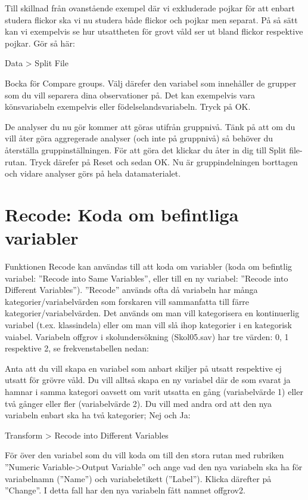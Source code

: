 \documentclass[
]{book}
\begin{document}
Till skillnad från ovanstående exempel där vi exkluderade pojkar för att enbart studera flickor ska vi nu studera både flickor och pojkar men separat. På så sätt kan vi exempelvis se hur utsattheten för grovt våld ser ut bland flickor respektive pojkar. Gör så här:

Data \textgreater{} Split File

Bocka för Compare groups. Välj därefer den variabel som innehåller de grupper som du vill separera dina observationer på. Det kan exempelvis vara könsvariabeln exempelvis eller födelselandsvariabeln. Tryck på OK.

De analyser du nu gör kommer att göras utifrån gruppnivå. Tänk på att om du vill åter göra aggregerade analyser (och inte på gruppnivå) så behöver du återställa gruppinställningen. För att göra det klickar du åter in dig till Split file-rutan. Tryck därefer på Reset och sedan OK. Nu är gruppindelningen borttagen och vidare analyser görs på hela datamaterialet.

\hypertarget{recode-koda-om-befintliga-variabler}{%
\section{Recode: Koda om befintliga variabler}\label{recode-koda-om-befintliga-variabler}}

Funktionen Recode kan användas till att koda om variabler (koda om befintlig variabel: ''Recode into
Same Variables'', eller till en ny variabel: ''Recode into Different Variables''). ''Recode'' används ofta då
variabeln har många kategorier/variabelvärden som forskaren vill sammanfatta till färre
kategorier/variabelvärden. Det används om man vill kategorisera en kontinuerlig variabel (t.ex.
klassindela) eller om man vill slå ihop kategorier i en kategorisk vaiabel. Variabeln offgrov i
skolundersökning (Skol05.sav) har tre värden: 0, 1 respektive 2, se frekvenstabellen nedan:

Anta att du vill skapa en variabel som anbart skiljer på utsatt respektive ej utsatt för grövre våld. Du vill
alltså skapa en ny variabel där de som svarat ja hamnar i samma kategori oavsett om varit utsatta en
gång (variabelvärde 1) eller två gånger eller fler (variabelvärde 2). Du vill med andra ord att den nya
variabeln enbart ska ha två kategorier; Nej och Ja:

Transform \textgreater{} Recode into Different Variables

För över den variabel som du vill koda om till den stora rutan med rubriken ''Numeric Variable-\textgreater Output
Variable'' och ange vad den nya variabeln ska ha för variabelnamn (''Name'') och variabeletikett
(''Label''). Klicka därefter på ''Change''. I detta fall har den nya variabeln fått namnet offgrov2.
\end{document}
